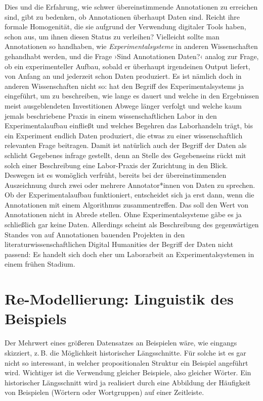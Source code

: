 \documentclass{article}
\begin{document}
Dies und die Erfahrung, wie schwer übereinstimmende Annotationen zu
erreichen sind, gibt zu bedenken, ob Annotationen überhaupt Daten
sind. Reicht ihre formale Homogenität, die sie aufgrund der Verwendung
digitaler Tools haben, schon aus, um ihnen diesen Status zu
verleihen? %
Vielleicht sollte man Annotationen so handhaben, wie
\emph{Experimentalsysteme} in anderen Wissenschaften gehandhabt
werden, und die Frage ›Sind Annotationen Daten?‹ analog zur Frage, ob
ein experimenteller Aufbau, sobald er überhaupt irgendeinen Output
liefert, von Anfang an und jederzeit schon Daten produziert. Es ist
nämlich doch in anderen Wissenschaften nicht so:
\textcite{Rheinberger2001a} hat den Begriff des Experimentalsystems ja
eingeführt, um zu beschreiben, wie lange es dauert und welche in den
Ergebnissen meist ausgeblendeten Investitionen Abwege länger verfolgt
und welche kaum jemals beschriebene Praxis in einem wissenschaftlichen
Labor in den Experimentalaufbau einfließt und welches Begehren das
Laborhandeln trägt, bis ein Experiment endlich Daten produziert, die
etwas zu einer wissenschaftlich relevanten Frage beitragen. Damit ist
natürlich auch der Begriff der Daten als schlicht Gegebenes infrage
gestellt, denn an Stelle des Gegebenseins rückt mit solch einer
Beschreibung eine Labor-Praxis der Zurichtung in den Blick. Deswegen
ist es womöglich verfrüht, bereits bei der übereinstimmenden
Auszeichnung durch zwei oder mehrere Annotator*innen von Daten zu
sprechen. Ob der Experimentalaufbau funktioniert, entscheidet sich ja
erst dann, wenn die Annotationen mit einem Algorithmus
zusammentreffen. Das soll den Wert von Annotationen nicht in Abrede
stellen. Ohne Experimentalsysteme gäbe es ja schließlich gar keine
Daten. Allerdings scheint als Beschreibung des gegenwärtigen Standes
von auf Annotationen bauenden Projekten in den
literaturwissenschaftlichen Digital Humanities der Begriff der Daten
nicht passend: Es handelt sich doch eher um Laborarbeit an
Experimentalsystemen in einem frühen Stadium.

\section{Re-Modellierung: Linguistik des Beispiels}

Der Mehrwert eines größeren Datensatzes an Beispielen wäre, wie
eingangs skizziert, z.\,B. die Möglichkeit historischer
Längsschnitte. Für solche ist es gar nicht so interessant, in welcher
propositionalen Struktur ein Beispiel angeführt wird. Wichtiger ist
die Verwendung gleicher Beispiele, also gleicher Wörter. Ein
historischer Längsschnitt wird ja realisiert durch eine Abbildung der
Häufigkeit von Beispielen (Wörtern oder Wortgruppen) auf einer
Zeitleiste.
\end{document}
